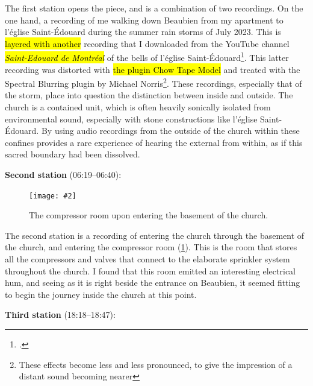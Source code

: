 \documentclass[12pt,twoside,maitrise]{dms_ks}
\newcommand{\customincludegraphics}[4][]{%
    \begin{figure}[H]
        \centering
        \texttt{[image: \#2]}
        \caption{#4}
	\label{#3} 
    \end{figure}
}
\theoremstyle{definition}
\begin{document}
{The first station opens the piece, and is a combination of two recordings. 
On the one hand, a recording of me walking down Beaubien from my apartment to l'église Saint-Édouard during the summer rain storms of July 2023. 
This is \hl{layered with another} recording that I downloaded from the YouTube channel \hl{\textit{Saint-Edouard de Montréal}} of the bells of l'église Saint-Édouard\footcite{saint-edouard_de_montreal_volee_2022}. 
This latter recording was distorted with \hl{the plugin Chow Tape Model} and treated with the Spectral Blurring plugin by Michael Norris\footnote{These effects become less and less pronounced, to give the impression of a distant sound becoming nearer}. 
These recordings, especially that of the storm, place into question the distinction between inside and outside. 
The church is a contained unit, which is often heavily sonically isolated from environmental sound, especially with stone constructions like l'église Saint-Édouard. 
By using audio recordings from the outside of the church within these confines provides a rare experience of hearing the external from within, as if this sacred boundary had been dissolved.


\textbf{Second station} (06:19--06:40):

\customincludegraphics[scale=0.15]{DSC00149_1.JPG}{fig:station2}{The compressor room upon entering the basement of the church.}%

The second station is a recording of entering the church through the basement of the church, and entering the compressor room (\cref{fig:station2}). 
This is the room that stores all the compressors and valves that connect to the elaborate sprinkler system throughout the church. 
I found that this room emitted an interesting electrical hum, and seeing as it is right beside the entrance on Beaubien, it seemed fitting to begin the journey inside the church at this point.

\textbf{Third station} (18:18--18:47):

}
\end{document}
